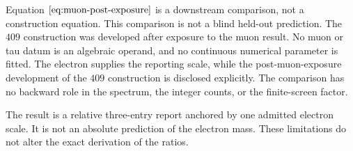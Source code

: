 Equation \(\eqref{eq:muon-post-exposure}\) is a downstream comparison, not a construction equation. This comparison is not a blind held-out prediction. The \(409\) construction was developed after exposure to the muon result. No muon or tau datum is an algebraic operand, and no continuous numerical parameter is fitted. The electron supplies the reporting scale, while the post-muon-exposure development of the \(409\) construction is disclosed explicitly. The comparison has no backward role in the spectrum, the integer counts, or the finite-screen factor.

The result is a relative three-entry report anchored by one admitted electron scale. It is not an absolute prediction of the electron mass. These limitations do not alter the exact derivation of the ratios.

